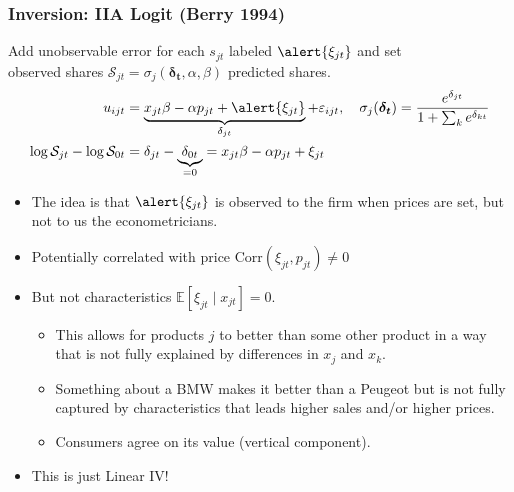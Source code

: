 \begin{frame}
\frametitle{Inversion: IIA Logit (Berry 1994)}
Add unobservable error for each $s_{jt}$ labeled $\alert{\xi_{jt}}$ and set\\
 \alert{observed shares} $\mathcal{S}_{jt} = \sigma_{j}(\boldsymbol{\delta_{t}},\alpha,\beta)$ \alert{predicted shares}.
\begin{align*}
u_{ijt} &= \underbrace{x_{jt} \beta -\alpha p_{jt} + \alert{\xi_{jt}}}_{\delta_{jt}} +  \varepsilon_{ijt} , \quad 
\sigma_j(\boldsymbol{\delta_{t}}) = \frac{e^{\delta_{jt}} }{1+\sum_k e^{\delta_{kt}} } \\
 \log \mathcal{S}_{jt} - \log \mathcal{S}_{0t} &= \delta_{jt} - \underbrace{\delta_{0t}}_{=0} 
 = x_{jt} \beta -\alpha p_{jt} + \xi_{jt}
\end{align*}
\vspace{-0.5cm}
\begin{itemize}
\item The idea is that $\alert{\xi_{jt}}$ is observed to the firm when prices are set, but not to us the econometricians.
\item Potentially correlated with price $\text{Corr}(\xi_{jt},p_{jt}) \neq 0$
\item But not characteristics $\mathbb{E}[\xi_{jt} \mid  x_{jt}]=0$.
\begin{itemize}
\item This allows for products $j$ to better than some other product in a way that is not fully explained by differences in $x_j$ and $x_k$.
\item Something about a BMW makes it better than a Peugeot but is not fully captured by characteristics that leads higher sales and/or higher prices.
\item Consumers agree on its value  (\alert{vertical component}).
\end{itemize}
\item This is just Linear IV!
\end{itemize}
\end{frame}


